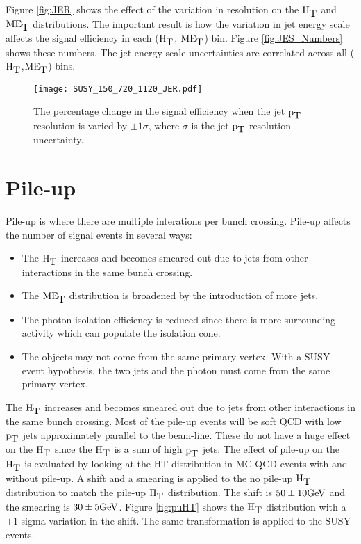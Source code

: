 Figure \ref{fig:JER} shows the effect of the variation in resolution on the
$\mbox{H}_{\mbox{T}}$ and $\mbox{ME}_{\mbox{T}}$ distributions. The important result is how the variation in jet
energy scale affects the signal efficiency in each ($\mbox{H}_{\mbox{T}}$, $\mbox{ME}_{\mbox{T}}$) bin. Figure 
\ref{fig:JES_Numbers} shows these numbers. The jet energy scale uncertainties 
are correlated across all ($\mbox{H}_{\mbox{T}}$,$\mbox{ME}_{\mbox{T}}$) bins.

\begin{figure}
\begin{center}
\texttt{[image: SUSY\_150\_720\_1120\_JER.pdf]}
\end{center}
\caption{The percentage change in the signal efficiency when the jet $\mbox{p}_{\mbox{T}}$
resolution is varied by $\pm1\sigma$, where $\sigma$ is the jet $\mbox{p}_{\mbox{T}}$ resolution 
uncertainty.}
\label{fig:JER_Numbers}
\end{figure}

\section{Pile-up}

Pile-up is where there are multiple interations per bunch crossing. Pile-up
affects the number of signal events in several ways:

\begin{itemize}
\item The $\mbox{H}_{\mbox{T}}$ increases and becomes smeared out due to jets from other 
interactions in the same bunch crossing.
\item The $\mbox{ME}_{\mbox{T}}$ distribution is broadened by the introduction of more jets.
\item The photon isolation efficiency is reduced since there is more 
surrounding activity which can populate the isolation cone.
\item The objects may not come from the same primary vertex. With a SUSY event
hypothesis, the two jets and the photon must come from the same primary vertex.
\end{itemize}

The $\mbox{H}_{\mbox{T}}$ increases and becomes smeared out due to jets from other 
interactions in the same bunch crossing. Most of the pile-up events will be soft
QCD with low $\mbox{p}_{\mbox{T}}$ jets approximately parallel to the beam-line. These do not
have a huge effect on the $\mbox{H}_{\mbox{T}}$ since the $\mbox{H}_{\mbox{T}}$ is a sum of high $\mbox{p}_{\mbox{T}}$ jets.
The effect of pile-up on the $\mbox{H}_{\mbox{T}}$ is evaluated by looking at the HT
distribution in MC QCD events with and without pile-up. A shift and a
smearing is applied to the no pile-up $\mbox{H}_{\mbox{T}}$ distribution to match the pile-up
$\mbox{H}_{\mbox{T}}$ distribution. The shift is $50\pm10\mbox{GeV}$ and the smearing is $30\pm5\mbox{GeV}$. 
Figure \ref{fig:puHT} shows the $\mbox{H}_{\mbox{T}}$ distribution with a $\pm 1$ sigma
variation in the shift. The same transformation is applied to the SUSY events.
\\

